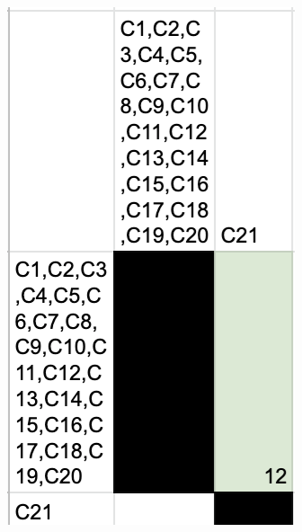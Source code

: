\documentclass[a4paper,table,xcdraw]{article}
\begin{document}
\includegraphics[scale=0.8]{./img/carac12.png}
\end{document}
